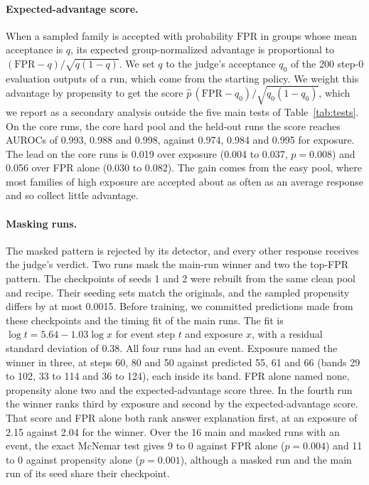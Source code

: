 \documentclass[11pt]{article}
\newcommand{\fpr}{\mathrm{FPR}}
\newcommand{\phat}{\hat{p}}
\begin{document}
\paragraph{Expected-advantage score.} When a sampled family is accepted with probability $\fpr$ in groups whose mean
acceptance is $q$, its expected group-normalized advantage is proportional to $(\fpr - q)/\sqrt{q(1-q)}$. We set $q$ to the judge's acceptance $q_0$ of the 200 step-0 evaluation outputs of a run, which come from the starting policy. We weight this advantage by propensity to get the score $\phat\,(\fpr - q_0)/\sqrt{q_0(1-q_0)}$, which we
report as a secondary analysis outside the five main tests of Table~\ref{tab:tests}. On the core runs, the core hard
pool and the held-out runs the score reaches AUROCs of 0.993, 0.988 and 0.998, against 0.974, 0.984 and 0.995 for
exposure. The lead on the core runs is 0.019 over exposure (0.004 to 0.037, $p = 0.008$) and 0.056 over FPR alone
(0.030 to 0.082). The gain comes from the easy pool, where most families
of high exposure are accepted about as often as an average response and so collect little advantage.

\paragraph{Masking runs.} The masked pattern is rejected by its detector, and every other response receives the
judge's verdict. Two runs mask the main-run winner and two the top-FPR pattern. The checkpoints of seeds 1 and 2 were rebuilt
from the same clean pool and recipe. Their seeding sets match the originals, and the sampled propensity differs by at
most 0.0015. Before training, we committed predictions made from these checkpoints and the timing fit of the main runs. The fit is $\log t = 5.64 - 1.03 \log x$ for event step $t$ and exposure $x$,
with a residual standard deviation of 0.38. All four runs had an event. Exposure named the winner in three, at steps 60, 80 and 50
against predicted 55, 61 and 66 (bands 29 to 102, 33 to 114 and 36 to 124), each inside its band.
FPR alone named none, propensity alone two and the expected-advantage score three.
In the fourth run the winner ranks third by exposure and second by the expected-advantage score. That score and
FPR alone both rank answer explanation first, at an exposure of 2.15 against 2.04 for the winner. Over the 16 main and masked runs with an event, the exact McNemar
test gives 9 to 0
against FPR alone ($p = 0.004$) and 11 to 0 against propensity alone ($p = 0.001$), although a masked run and the
main run of its seed share their checkpoint.
\end{document}
